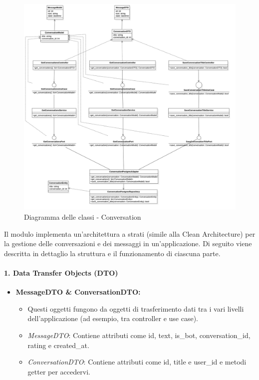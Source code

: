     \begin{figure}[H]
        \centering
        \includegraphics[width=\linewidth, height=0.8\textheight, keepaspectratio]{./img/Conversation.png}
        \caption{Diagramma delle classi - Conversation}
        \label{fig:conversation}
    \end{figure}

    Il modulo implementa un'architettura a strati (simile alla Clean Architecture) per la gestione delle conversazioni e dei messaggi in un'applicazione. Di seguito viene descritta in dettaglio la struttura e il funzionamento di ciascuna parte.

    \paragraph{1. Data Transfer Objects (DTO)}
    \begin{itemize}
        \item \textbf{MessageDTO \& ConversationDTO:}
        \begin{itemize}
            \item Questi oggetti fungono da oggetti di trasferimento dati tra i vari livelli dell'applicazione (ad esempio, tra controller e use case).
            \item \textit{MessageDTO}: Contiene attributi come id, text, is\_bot, conversation\_id, rating e created\_at.
            \item \textit{ConversationDTO}: Contiene attributi come id, title e user\_id e metodi getter per accedervi.
        \end{itemize}
    \end{itemize}

